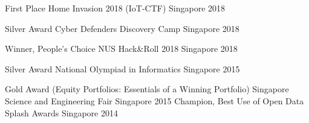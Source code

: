 


\begin{cvhonors}

  \cvhonor
    {First Place} %
    {Home Invasion 2018 (IoT-CTF)} %
    {Singapore} %
    {2018} %

  \cvhonor
    {Silver Award} %
    {Cyber Defenders Discovery Camp} %
    {Singapore} %
    {2018} %

  \cvhonor
    {Winner, People's Choice} %
    {NUS Hack\&Roll 2018} %
    {Singapore} %
    {2018} %

  \cvhonor
    {Silver Award} %
    {National Olympiad in Informatics} %
    {Singapore} %
    {2015} %

  \cvhonor
    {Gold Award (Equity Portfolios: Essentials of a Winning Portfolio)} %
    {Singapore Science and Engineering Fair} %
    {Singapore} %
    {2015} %
  \cvhonor
    {Champion, Best Use of Open Data} %
    {Splash Awards} %
    {Singapore} %
    {2014} %
\end{cvhonors}

